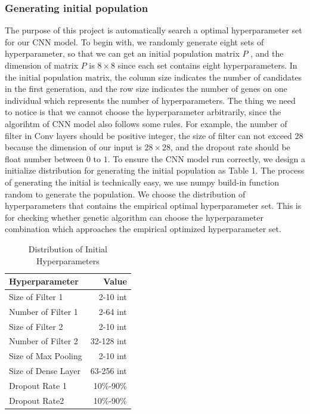 \documentclass[12pt]{article}
\begin{document}
\subsubsection{Generating initial population}
The purpose of this project is automatically search a optimal hyperparameter set for our CNN model. To begin with, we randomly generate eight sets of hyperparameter, so that we can get an initial  population matrix $P$ , and the dimension of matrix $P$ is $8 \times 8$ since each set contains eight hyperparameters. In the initial population matrix, the column size indicates the number of candidates in the first generation, and the row size indicates the number of genes on one individual which represents the number of hyperparameters. The thing we need to notice is that we cannot choose the hyperparameter arbitrarily, since the algorihtm of CNN model also follows some rules. For example, the number of filter in Conv layers should be positive integer, the size of filter can not exceed $28$ because the dimension of our input is $28 \times 28$, and the dropout rate should be float number between $0$ to $1$. To ensure the CNN model run correctly, we design a initialize distribution for generating the initial population as Table 1. The process of generating the initial is technically easy, we use numpy build-in function random to generate the population. We choose the distribution of hyperparameters that contains the empirical optimal hyperparameter set. This is for checking whether genetic algorithm can choose the hyperparameter combination which approaches the empirical optimized hyperparameter set.
\begin{table}
\caption{Distribution of Initial Hyperparameters}
\centering
\begin{tabular}{l r}
\hline\hline 
Hyperparameter & Value \\ [0.5ex]
\hline
Size of Filter 1 & 2-10 int \\
Number of Filter 1 & 2-64 int \\
Size of Filter 2 & 2-10 int \\
Number of Filter 2 & 32-128 int \\
Size of Max Pooling & 2-10 int \\
Size of Dense Layer & 63-256 int \\
Dropout Rate 1 & 10\%-90\% \\
Dropout Rate2 & 10\%-90\% \\
\hline
\end{tabular}
\label{table:hpara}
\end{table}
\end{document}

